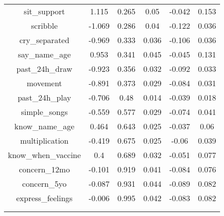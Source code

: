 \begin{table}[!htbp]
\begin{tabular}{@{\extracolsep{5pt}} cccccc}
sit\_support & 1.115 & 0.265 & 0.05 & -0.042 & 0.153 \\ 
scribble & -1.069 & 0.286 & 0.04 & -0.122 & 0.036 \\ 
cry\_separated & -0.969 & 0.333 & 0.036 & -0.106 & 0.036 \\ 
say\_name\_age & 0.953 & 0.341 & 0.045 & -0.045 & 0.131 \\ 
past\_24h\_draw & -0.923 & 0.356 & 0.032 & -0.092 & 0.033 \\ 
movement & -0.891 & 0.373 & 0.029 & -0.084 & 0.031 \\ 
past\_24h\_play & -0.706 & 0.48 & 0.014 & -0.039 & 0.018 \\ 
simple\_songs & -0.559 & 0.577 & 0.029 & -0.074 & 0.041 \\ 
know\_name\_age & 0.464 & 0.643 & 0.025 & -0.037 & 0.06 \\ 
multiplication & -0.419 & 0.675 & 0.025 & -0.06 & 0.039 \\ 
know\_when\_vaccine & 0.4 & 0.689 & 0.032 & -0.051 & 0.077 \\ 
concern\_12mo & -0.101 & 0.919 & 0.041 & -0.084 & 0.076 \\ 
concern\_5yo & -0.087 & 0.931 & 0.044 & -0.089 & 0.082 \\ 
express\_feelings & -0.006 & 0.995 & 0.042 & -0.083 & 0.082 \\ 
 &  &  &  &  &  \\ 
\hline \\[-1.8ex] 
\end{tabular} 
\end{table} 
